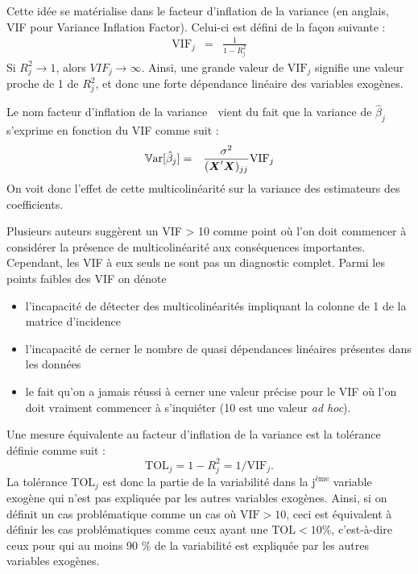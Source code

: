 Cette idée se matérialise dans le facteur d'inflation de la variance (en anglais, VIF pour Variance Inflation Factor). Celui-ci est défini de la façon suivante :
\begin{eqnarray}
  \mbox{VIF}_j &=& \frac{1}{1-R_j^2}
\end{eqnarray}
Si $R_j^2\rightarrow 1$, alors $VIF_j\rightarrow \infty$. Ainsi, une grande valeur de $\mbox{VIF}_j$ signifie une valeur proche de 1 de $R_j^2$, et donc une forte dépendance linéaire des variables exogènes.

Le nom \og facteur d'inflation de la variance \fg  $\;$ vient du fait que la variance de $\hat{\beta}_j$ s'exprime en fonction du VIF comme suit :
\begin{eqnarray*}
  \mathbb{V}\text{ar}[\hat{\beta}_j] &=& \frac{\sigma^2}{(\mbox{\boldmath$X$\unboldmath}'\mbox{\boldmath$X$\unboldmath})_{jj}} \mbox{VIF}_j
\end{eqnarray*}
On voit donc l'effet de cette multicolinéarité sur la variance des estimateurs des coefficients.

 Plusieurs
auteurs suggèrent un VIF > 10 comme point où l'on doit commencer à considérer la présence
de multicolinéarité aux conséquences importantes. Cependant, les VIF à eux seuls ne sont
pas un diagnostic complet. Parmi les points faibles des VIF on dénote
\begin{itemize}
\item [(i)]l'incapacité de détecter des multicolinéarités impliquant la colonne de 1 de la matrice d'incidence
\item [(ii)] l'incapacité de cerner le nombre de quasi dépendances linéaires présentes dans les données
\item [(iii)] le fait qu'on a jamais réussi à cerner une valeur précise pour le VIF où l'on doit vraiment commencer à s'inquiéter (10 est une valeur \textit{ ad hoc}).
\end{itemize}

\begin{remarque}
Une mesure équivalente au facteur d'inflation de la variance est la tolérance définie comme suit :
$$\mbox{TOL}_j=1-R_j^2=1/\mbox{VIF}_j.$$
La tolérance $\mbox{TOL}_j$ est donc la partie de la variabilité dans la j$^{\text{ème}}$ variable exogène qui n'est pas expliquée par les autres variables exogènes. Ainsi, si on définit un cas problématique comme un cas où $\mbox{VIF}>10$, ceci est équivalent à définir les cas problématiques comme ceux ayant une $\mbox{TOL}< 10 \%$, c'est-à-dire ceux pour qui au moins 90 \% de la variabilité est expliquée par les autres variables exogènes.
\end{remarque}

